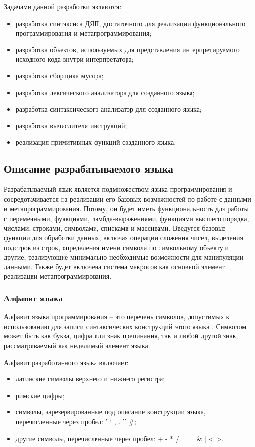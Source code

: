 Задачами данной разработки являются:
\begin{itemize}
\item разработка синтаксиса ДЯП, достаточного для реализации функционального программирования и метапрограммирования;
\item разработка объектов, используемых для представления интерпретируемого исходного кода внутри интерпретатора;
\item разработка сборщика мусора;
\item разработка лексического анализатора для созданного языка;
\item разработка синтаксического анализатор для созданного языка;
\item разработка вычислителя инструкций;
\item реализация примитивных функций созданного языка.
\end{itemize}


\subsection{Описание разрабатываемого языка}

Разрабатываемый язык является подмножеством языка программирования  и сосредотачивается на реализации его базовых возможностей по работе с данными и метапрограммирования. Потому, он будет иметь функциональность для работы с переменными, функциями, лямбда-выражениями, функциями высшего порядка, числами, строками, символами, списками и массивами. Введутся базовые функции для обработки данных, включая операции сложения чисел, выделения подстрок из строк, определения имени символа по символьному объекту и другие, реализующие минимально необходимые возможности для манипуляции данными. Также будет включена система макросов как основной элемент реализации метапрограммирования.

\subsubsection{Алфавит языка}
Алфавит языка программирования -- это перечень символов, допустимых к использованию для записи синтаксических конструкций этого языка \cite{e4}. Символом может быть как буква, цифра или знак препинания, так и любой другой знак, рассматриваемый как неделимый элемент языка.

Алфавит разработанного языка включает:
\begin{itemize}
	\item латинские символы верхнего и нижнего регистра;
	\item римские цифры;
	\item символы, зарезервированные под описание конструкций языка, перечисленные через пробел: ' ` , . '' \#;
	\item другие символы, перечисленные через пробел: + - * / = \_ \& | < >.
\end{itemize}

